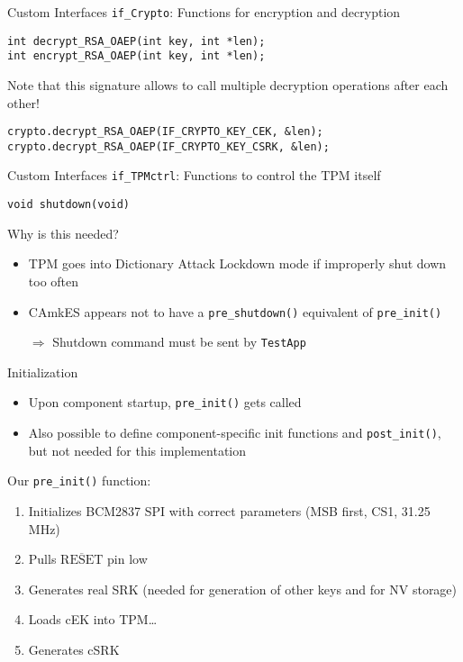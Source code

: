 \begin{frame}[fragile]{Custom Interfaces}
\texttt{if\_Crypto}: Functions for encryption and decryption

\begin{verbatim}
int decrypt_RSA_OAEP(int key, int *len);
int encrypt_RSA_OAEP(int key, int *len);
\end{verbatim}

Note that this signature allows to call multiple decryption operations after each other!

\begin{verbatim}
crypto.decrypt_RSA_OAEP(IF_CRYPTO_KEY_CEK, &len);
crypto.decrypt_RSA_OAEP(IF_CRYPTO_KEY_CSRK, &len);
\end{verbatim}
\end{frame}

\begin{frame}[fragile]{Custom Interfaces}
\texttt{if\_TPMctrl}: Functions to control the TPM itself

\begin{verbatim}
void shutdown(void)
\end{verbatim}

Why is this needed?

\begin{itemize}
\item TPM goes into Dictionary Attack Lockdown mode if improperly shut down too often
\item CAmkES appears not to have a \texttt{pre\_shutdown()} equivalent of \texttt{pre\_init()}
\item[$\Rightarrow$] Shutdown command must be sent by \texttt{TestApp}
\end{itemize}
\end{frame}

\begin{frame}{Initialization}
\begin{itemize}
\item Upon component startup, \texttt{pre\_init()} gets called
\item Also possible to define component-specific init functions and \texttt{post\_init()}, but not needed for this implementation
\end{itemize}

Our \texttt{pre\_init()} function:

\begin{enumerate}
\item Initializes BCM2837 SPI with correct parameters (MSB first, CS1, 31.25 MHz)
\item Pulls $\overline{\mbox{RESET}}$ pin low
\item Generates real SRK (needed for generation of other keys and for NV storage)
\item Loads cEK into TPM\ldots
\item Generates cSRK
\end{enumerate}
\end{frame}

